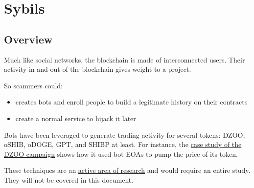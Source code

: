 \section{Sybils} \label{sec:sybils}

\subsection{Overview}

Much like social networks, the blockchain is made of interconnected users.
Their activity in and out of the blockchain gives weight to a project.

So scammers could:

\begin{itemize}
\item{creates bots and enroll people to build a legitimate history on their contracts}
\item{create a normal service to hijack it later}
\end{itemize}

Bots have been leveraged to generate trading activity for several tokens: DZOO, oSHIB, oDOGE, GPT, and SHIBP at least.
For instance, the \href{\urlarticlesoftrugpull}{case study of the DZOO campaign} shows how it used bot EOAs to pump the price of its token.

These techniques are an \href{\urlarticlesybilattack}{active area of research} and would require an entire study.
They will not be covered in this document.
